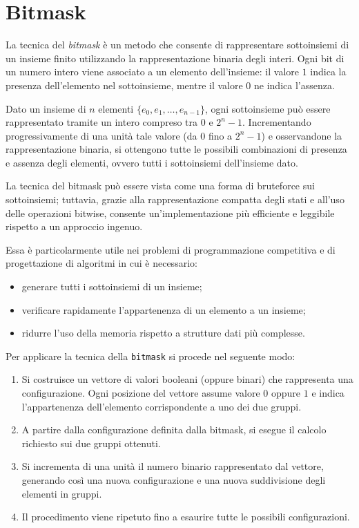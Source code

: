 \newpage
\section{Bitmask}
La tecnica del \textit{bitmask} è un metodo che consente di rappresentare sottoinsiemi di un insieme finito utilizzando la rappresentazione binaria degli interi.  
Ogni bit di un numero intero viene associato a un elemento dell’insieme: il valore $1$ indica la presenza dell’elemento nel sottoinsieme, mentre il valore $0$ ne indica l’assenza.

Dato un insieme di $n$ elementi $\{e_0, e_1, \dots, e_{n-1}\}$, ogni sottoinsieme può essere rappresentato tramite un intero compreso tra $0$ e $2^n - 1$.  
Incrementando progressivamente di una unità tale valore (da $0$ fino a $2^n - 1$) e osservandone la rappresentazione binaria, si ottengono tutte le possibili combinazioni di presenza e assenza degli elementi, ovvero tutti i sottoinsiemi dell’insieme dato.

La tecnica del bitmask può essere vista come una forma di bruteforce sui sottoinsiemi; tuttavia, grazie alla rappresentazione compatta degli stati e all’uso delle operazioni bitwise, consente un’implementazione più efficiente e leggibile rispetto a un approccio ingenuo.

Essa è particolarmente utile nei problemi di programmazione competitiva e di progettazione di algoritmi in cui è necessario:
\begin{itemize}
	\item generare tutti i sottoinsiemi di un insieme;
	\item verificare rapidamente l’appartenenza di un elemento a un insieme;
	\item ridurre l’uso della memoria rispetto a strutture dati più complesse.
\end{itemize}

\bigskip
Per applicare la tecnica della \texttt{bitmask} si procede nel seguente modo:

\begin{enumerate}
	\item Si costruisce un vettore di valori booleani (oppure binari) che rappresenta una configurazione.  
	Ogni posizione del vettore assume valore $0$ oppure $1$ e indica l’appartenenza dell’elemento corrispondente a uno dei due gruppi.
	
	\item A partire dalla configurazione definita dalla bitmask, si esegue il calcolo richiesto sui due gruppi ottenuti.
	
	\item Si incrementa di una unità il numero binario rappresentato dal vettore, generando così una nuova configurazione e una nuova suddivisione degli elementi in gruppi.
	
	\item Il procedimento viene ripetuto fino a esaurire tutte le possibili configurazioni.
\end{enumerate}


